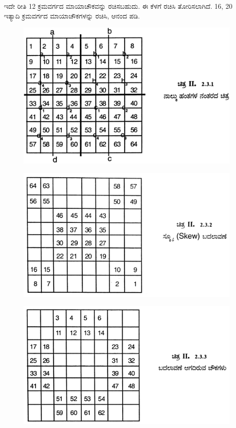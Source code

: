 ಇದೇ ರೀತಿ 12 ಕ್ರಮವರ್ಗದ ಮಾಯಾಚೌಕವನ್ನು ರಚಿಸಬಹುದು. ಈ ಕೆಳಗೆ ರಚಿಸಿ ತೋರಿಸಲಾಗಿದೆ. 16, 20 ಇತ್ಯಾದಿ ಕ್ರಮವರ್ಗದ ಮಾಯಾಚೌಕಗಳನ್ನು ರಚಿಸಿ, ಆನಂದ ಪಡಿ.
\begin{figure}[H]
\includegraphics[scale=1.2]{src/figures/chap3/fig3-24.jpg}
\end{figure}
\begin{figure}[H]
\includegraphics[scale=.85]{src/figures/chap3/fig3-25.jpg}
\end{figure}
\begin{figure}[H]
\includegraphics[scale=.85]{src/figures/chap3/fig3-26.jpg}
\end{figure}
